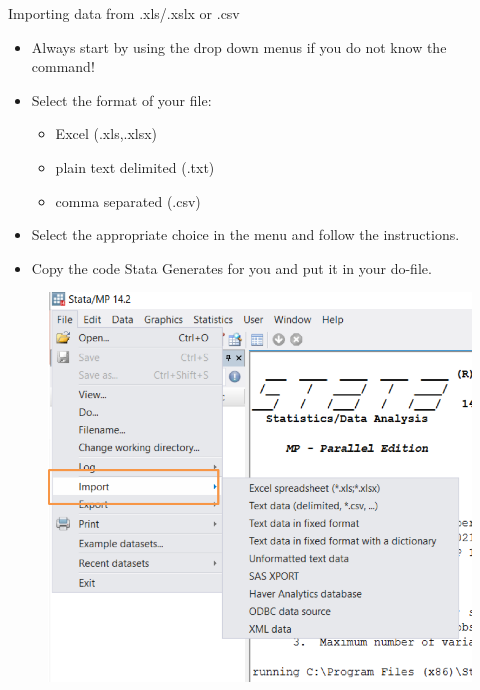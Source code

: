 \documentclass[aspectratio=169]{beamer}
\begin{document}
\begin{frame}[fragile]{Importing data from .xls/.xslx or .csv}

\begin{multicols}{2}	
	\begin{itemize}
		\item Always start by using the drop down menus if you do not know the command!
		\item Select the format of your file: 
				\begin{itemize}
					\item Excel (.xls,.xlsx)
					\item plain text delimited (.txt)
					\item comma separated (.csv)
				\end{itemize}		
		\item Select the appropriate choice in the menu and follow the instructions.
		\item Copy the code Stata Generates for you and put it in your do-file. 
	\end{itemize}
	\begin{figure}
		\centering
		\includegraphics[width=\linewidth]{img/importcsv}
	\end{figure}
\end{multicols}
\end{frame}
\end{document}

